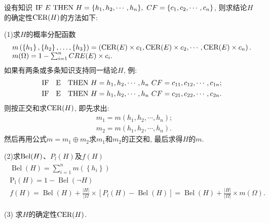 设有知识 $\textup{IF}\,\,   E \,\, \textup{THEN} \,\, H=\{h_1, h_2, \cdots , h_n\}, \,\, CF=\{c_1, c_2, \cdots, c_n\}$, 则求结论$H$的确定性$\textup{CER}(H)$的方法如下:

(1)求$H$的概率分配函数
\begin{align}
\begin{array}{l}
m\left(\left\{h_{1}\right\},\left\{h_{2}\right\}, \ldots,\left\{h_{3}\right\}\right)
=\left( \textup{CER}(E) \times c_{1}, \textup{CER}(E) \times c_{2}, \cdots, \textup{CER}(E) \times c_{n}\right).\\
{m(\Omega)=1-\sum_{i=1}^{n} CRE(E) \times c_{i}}.
\end{array}
\end{align}
 如果有两条或多条知识支持同一结论$H$, 例:
\begin{align}
  &\textup{IF \,\,  E \,\,  THEN}   \,\, H={h_1, h_2, \cdots , h_n} \,\,  CF={c_{11}, c_{12}, \cdots , c_{1n}};\\
  &\textup{IF \,\,  E  \,\, THEN}  \,\,  H={h_1, h_2, \cdots , h_n} \,\,  CF={c_{21}, c_{22}, \cdots , c_{2n}}.
\end{align}
则按正交和求$\textup{CER}(H)$, 即先求出:
\begin{align}
  &m_1=m({h_1},{h_2},\cdots,{h_n});\\
  &m_2=m({h_1},{h_2},\cdots,{h_n}).
\end{align}
然后再用公式$m=m_{1} \oplus m_{2}$求$m_1$和$m_2$的正交和, 最后求得$H$的$m$.

(2)求$\textup{Bel}(H)$、$P_l(H)$及$f(H)$
\begin{align}
\begin{array}{l}
 \operatorname{Bel}(H)=\sum_{i=1}^{n} m\left(\left\{h_{i}\right\}\right) \\
\operatorname{P_l}(H)=1-\operatorname{Bel}(\neg H)\\
f(H)=\operatorname{Bel}(H)+\frac{|H|}{| \Omega} \times[P_l(H)-\operatorname{Bel}(H)]=\operatorname{Bel}(H)+\frac{|H|}{|\Omega|} \times m(\Omega).
\end{array}
\end{align}

(3) 求$H$的确定性$\textup{CER}(H)$.

